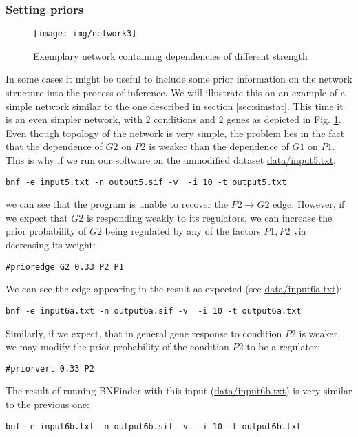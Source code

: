 \subsubsection{Setting priors}
\label{sec:simprio}
\begin{figure}[h]
  \centering
  \texttt{[image: img/network3]}  
  \caption{Exemplary network containing dependencies of different strength}
  \label{fig:net3}
\end{figure}
In some cases it might be useful to include some prior information on
the network structure into the process of inference. We will
illustrate this on an example of a simple network similar to the one
described in section \ref{sec:simstat}. This time it is an even
simpler network, with 2 conditions and 2 genes as depicted in
Fig. \ref{fig:net3}. Even though topology of the network is very
simple, the problem lies in the fact that the dependence of $G2$ on
$P2$ is weaker than the dependence of $G1$ on $P1$. This is why if we
run our software on the unmodified dataset \url{data/input5.txt}, 
\begin{verbatim}
bnf -e input5.txt -n output5.sif -v  -i 10 -t output5.txt
\end{verbatim}
we can see that the program is unable to recover the $P2\rightarrow G2$
edge. However, if we expect that $G2$ is  responding weakly to its regulators, 
we can increase the prior probability of $G2$ being regulated by any of 
the factors $P1,P2$ via decreasing its weight:
\begin{verbatim}
#prioredge G2 0.33 P2 P1
\end{verbatim}
We can see the edge appearing in the result as expected (see \url{data/input6a.txt}):
\begin{verbatim}
bnf -e input6a.txt -n output6a.sif -v  -i 10 -t output6a.txt
\end{verbatim}

Similarly, if we expect, that in general gene response to condition $P2$ is weaker, we may modify the prior probability of the condition $P2$ to be a regulator:
\begin{verbatim}
#priorvert 0.33 P2 
\end{verbatim}

The result of running BNFinder with this input (\url{data/input6b.txt}) is very similar to the previous one:
\begin{verbatim}
bnf -e input6b.txt -n output6b.sif -v  -i 10 -t output6b.txt
\end{verbatim}

